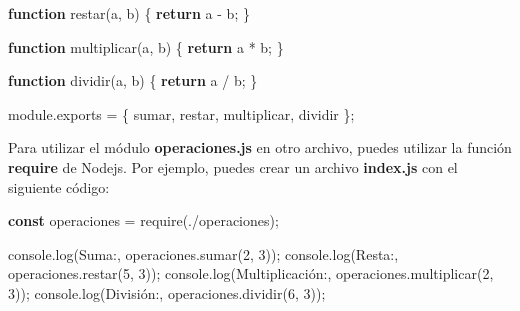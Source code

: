 \documentclass[
  a4paper,
  DIV=11,
  numbers=noendperiod,
  onepage,
  openany]{scrreprt}
\newenvironment{Shaded}{\begin{snugshade}}{\end{snugshade}}
\newcommand{\AttributeTok}[1]{\textcolor[rgb]{0.40,0.45,0.13}{#1}}
\newcommand{\BuiltInTok}[1]{\textcolor[rgb]{0.00,0.23,0.31}{#1}}
\newcommand{\ControlFlowTok}[1]{\textcolor[rgb]{0.00,0.23,0.31}{\textbf{#1}}}
\newcommand{\DecValTok}[1]{\textcolor[rgb]{0.68,0.00,0.00}{#1}}
\newcommand{\FunctionTok}[1]{\textcolor[rgb]{0.28,0.35,0.67}{#1}}
\newcommand{\KeywordTok}[1]{\textcolor[rgb]{0.00,0.23,0.31}{\textbf{#1}}}
\newcommand{\NormalTok}[1]{\textcolor[rgb]{0.00,0.23,0.31}{#1}}
\newcommand{\OperatorTok}[1]{\textcolor[rgb]{0.37,0.37,0.37}{#1}}
\newcommand{\PreprocessorTok}[1]{\textcolor[rgb]{0.68,0.00,0.00}{#1}}
\newcommand{\StringTok}[1]{\textcolor[rgb]{0.13,0.47,0.30}{#1}}
\begin{document}
\begin{tcolorbox}
\begin{Shaded}
\begin{Highlighting}[]
\KeywordTok{function} \FunctionTok{restar}\NormalTok{(a}\OperatorTok{,}\NormalTok{ b) \{}
  \ControlFlowTok{return}\NormalTok{ a }\OperatorTok{{-}}\NormalTok{ b}\OperatorTok{;}
\NormalTok{\}}

\KeywordTok{function} \FunctionTok{multiplicar}\NormalTok{(a}\OperatorTok{,}\NormalTok{ b) \{}
  \ControlFlowTok{return}\NormalTok{ a }\OperatorTok{*}\NormalTok{ b}\OperatorTok{;}
\NormalTok{\}}

\KeywordTok{function} \FunctionTok{dividir}\NormalTok{(a}\OperatorTok{,}\NormalTok{ b) \{}
  \ControlFlowTok{return}\NormalTok{ a }\OperatorTok{/}\NormalTok{ b}\OperatorTok{;}
\NormalTok{\}}

\NormalTok{module}\OperatorTok{.}\AttributeTok{exports} \OperatorTok{=}\NormalTok{ \{}
\NormalTok{  sumar}\OperatorTok{,}
\NormalTok{  restar}\OperatorTok{,}
\NormalTok{  multiplicar}\OperatorTok{,}
\NormalTok{  dividir}
\NormalTok{\}}\OperatorTok{;}
\end{Highlighting}
\end{Shaded}

Para utilizar el módulo \textbf{operaciones.js} en otro archivo, puedes
utilizar la función \textbf{require} de Nodejs. Por ejemplo, puedes
crear un archivo \textbf{index.js} con el siguiente código:

\begin{Shaded}
\begin{Highlighting}[]
\KeywordTok{const}\NormalTok{ operaciones }\OperatorTok{=} \PreprocessorTok{require}\NormalTok{(}\StringTok{\textquotesingle{}./operaciones\textquotesingle{}}\NormalTok{)}\OperatorTok{;}

\BuiltInTok{console}\OperatorTok{.}\FunctionTok{log}\NormalTok{(}\StringTok{\textquotesingle{}Suma:\textquotesingle{}}\OperatorTok{,}\NormalTok{ operaciones}\OperatorTok{.}\FunctionTok{sumar}\NormalTok{(}\DecValTok{2}\OperatorTok{,} \DecValTok{3}\NormalTok{))}\OperatorTok{;}
\BuiltInTok{console}\OperatorTok{.}\FunctionTok{log}\NormalTok{(}\StringTok{\textquotesingle{}Resta:\textquotesingle{}}\OperatorTok{,}\NormalTok{ operaciones}\OperatorTok{.}\FunctionTok{restar}\NormalTok{(}\DecValTok{5}\OperatorTok{,} \DecValTok{3}\NormalTok{))}\OperatorTok{;}
\BuiltInTok{console}\OperatorTok{.}\FunctionTok{log}\NormalTok{(}\StringTok{\textquotesingle{}Multiplicación:\textquotesingle{}}\OperatorTok{,}\NormalTok{ operaciones}\OperatorTok{.}\FunctionTok{multiplicar}\NormalTok{(}\DecValTok{2}\OperatorTok{,} \DecValTok{3}\NormalTok{))}\OperatorTok{;}
\BuiltInTok{console}\OperatorTok{.}\FunctionTok{log}\NormalTok{(}\StringTok{\textquotesingle{}División:\textquotesingle{}}\OperatorTok{,}\NormalTok{ operaciones}\OperatorTok{.}\FunctionTok{dividir}\NormalTok{(}\DecValTok{6}\OperatorTok{,} \DecValTok{3}\NormalTok{))}\OperatorTok{;}
\end{Highlighting}
\end{Shaded}


\end{tcolorbox}
\end{document}
